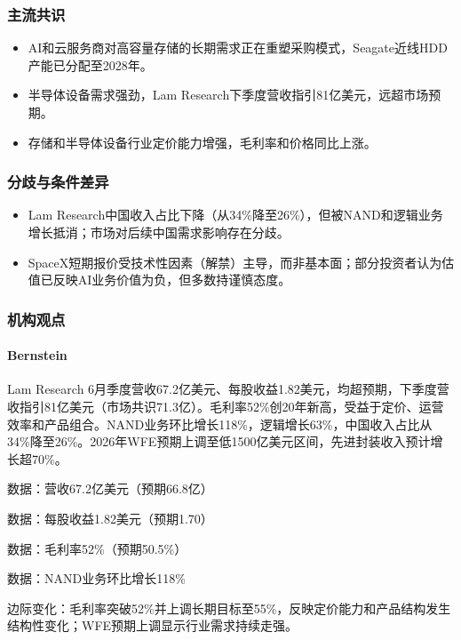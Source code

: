 \documentclass[11pt]{ctexart}
\begin{document}
\subsubsection*{主流共识}
\begin{itemize}
  \item AI和云服务商对高容量存储的长期需求正在重塑采购模式，Seagate近线HDD产能已分配至2028年。
  \item 半导体设备需求强劲，Lam Research下季度营收指引81亿美元，远超市场预期。
  \item 存储和半导体设备行业定价能力增强，毛利率和价格同比上涨。
\end{itemize}
\subsubsection*{分歧与条件差异}
\begin{itemize}
  \item Lam Research中国收入占比下降（从34\%降至26\%），但被NAND和逻辑业务增长抵消；市场对后续中国需求影响存在分歧。
  \item SpaceX短期报价受技术性因素（解禁）主导，而非基本面；部分投资者认为估值已反映AI业务价值为负，但多数持谨慎态度。
\end{itemize}
\subsubsection*{机构观点}
\paragraph{Bernstein} Lam Research 6月季度营收67.2亿美元、每股收益1.82美元，均超预期，下季度营收指引81亿美元（市场共识71.3亿）。毛利率52\%创20年新高，受益于定价、运营效率和产品组合。NAND业务环比增长118\%，逻辑增长63\%，中国收入占比从34\%降至26\%。2026年WFE预期上调至低1500亿美元区间，先进封装收入预计增长超70\%。
{\small\color{refgray}数据：营收67.2亿美元（预期66.8亿）\par}
{\small\color{refgray}数据：每股收益1.82美元（预期1.70）\par}
{\small\color{refgray}数据：毛利率52\%（预期50.5\%）\par}
{\small\color{refgray}数据：NAND业务环比增长118\%\par}
{\small\color{refgray}边际变化：毛利率突破52\%并上调长期目标至55\%，反映定价能力和产品结构发生结构性变化；WFE预期上调显示行业需求持续走强。\par}
\end{document}
